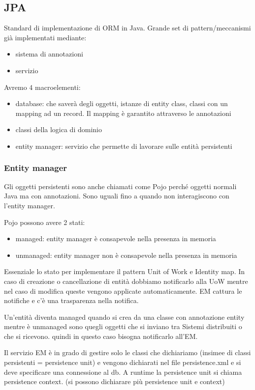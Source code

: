 \subsection{JPA}
Standard di implementazione di ORM in Java.
Grande set di pattern/meccanismi già implementati mediante:
\begin{itemize}
      \item sistema di annotazioni
      \item servizio
\end{itemize}

Avremo 4 macroelementi:
\begin{itemize}
      \item database: che saverà degli oggetti, istanze di entity class, classi
      con un mapping ad un record. Il mapping è garantito attraverso le annotazioni
      \item classi della logica di dominio
      \item entity manager: servizio che permette di lavorare sulle entità persistenti
\end{itemize}

\subsubsection{Entity manager}
Gli oggetti persistenti sono anche chiamati come Pojo perché oggetti normali Java
ma con annotazioni. Sono uguali fino a quando non interagiscono con l'entity manager.

Pojo possono avere 2 stati:
\begin{itemize}
      \item managed: entity manager è consapevole nella presenza in memoria
      \item unmanaged: entity manager non è consapevole nella presenza in memoria
\end{itemize}
Essenziale lo stato per implementare il pattern Unit of Work e Identity map.
In caso di creazione o cancellazione di entità dobbiamo notificarlo alla UoW mentre
nel caso di modifica queste vengono applicate automaticamente. 
EM cattura le notifiche e c'è una trasparenza nella notifica.

Un'entità diventa managed quando si crea da una classe con annotazione entity mentre
è unmanaged sono quegli oggetti che si inviano tra Sistemi distribuiti o che si ricevono.
quindi in questo caso bisogna notificarlo all'EM.

Il servizio EM è in grado di gestire solo le classi che dichiariamo (insimee di classi persistenti = persistence unit)
e vengono dichiarati nel file persistence.xml e si deve specificare una connessione al db.
A runtime la persistence unit si chiama persistence context. (si possono dichiarare più persistence unit e context)


